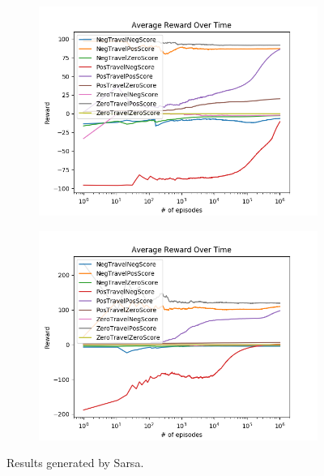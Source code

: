 \documentclass[result.tex]{subfiles}
\begin{document}
\begin{figure}[ht]
        \begin{subfigure}[b]{.35\linewidth}
            \includegraphics[width=\linewidth]{../images/sarsa/reward/234/board_state_average_reward_over_time.png}
        \end{subfigure}
        \begin{subfigure}[b]{.35\linewidth}
            \includegraphics[width=\linewidth]{../images/sarsa/reward/234/directional_distance_state_average_reward_over_time.png}
        \end{subfigure}
        \caption{Results generated by Sarsa.}
        \label{fig:reward_result_sarsa}
    \end{figure}

    \newpage
\end{document}
